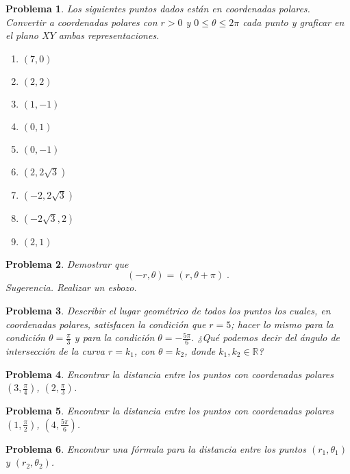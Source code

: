 \documentclass[letterpaper,12pt]{article}
\newtheorem{prob}{Problema}
\begin{document}
\begin{prob}
Los siguientes puntos dados están en coordenadas polares. Convertir a coordenadas polares con $r>0$ y $0\leq \theta \leq 2\pi$ cada punto y graficar en el plano $XY$ ambas representaciones.
\begin{multicols}{3}
\begin{enumerate}[label=\alph*)]
    \item $(7,0)$
    \item $(2,2)$
    \item $(1,-1)$
    \item $(0,1)$
    \item $(0,-1)$
    \item $\left(2,2\sqrt{3}\right)$
    \item $(-2,2\sqrt{3})$
    \item $(-2\sqrt{3},2)$
    \item $(2,1)$
\end{enumerate}
\end{multicols}
\end{prob}

\begin{prob}
Demostrar que 
\[(-r,\theta)=(r,\theta+\pi)\;.\]
\emph{Sugerencia. Realizar un esbozo.}
\end{prob}

\begin{prob}
Describir el lugar geométrico de todos los puntos los cuales, en coordenadas polares, satisfacen la condición que $r=5$; hacer lo mismo para la condición $\displaystyle \theta=\frac{\pi}{3}$ y para la condición $\displaystyle \theta=-\frac{5\pi}{6}$. ¿Qué podemos decir del ángulo de intersección de la curva $r=k_1$, con $\theta=k_2$, donde $k_1,k_2\in\mathbb{R}$?
\end{prob}

\begin{prob}
Encontrar la distancia entre los puntos con coordenadas polares $\displaystyle \left(3,\frac{\pi}{4}\right)$, $\displaystyle \left(2,\frac{\pi}{3}\right)$.
\end{prob}

\begin{prob}
Encontrar la distancia entre los puntos con coordenadas polares $\displaystyle \left(1,\frac{\pi}{2}\right)$, $\displaystyle \left(4,\frac{5\pi}{6}\right)$.
\end{prob}

\begin{prob}
Encontrar una fórmula para la distancia entre los puntos $\displaystyle \left(r_1,\theta_1\right)$ y $\displaystyle \left(r_2,\theta_2\right)$.
\end{prob}
\end{document}
